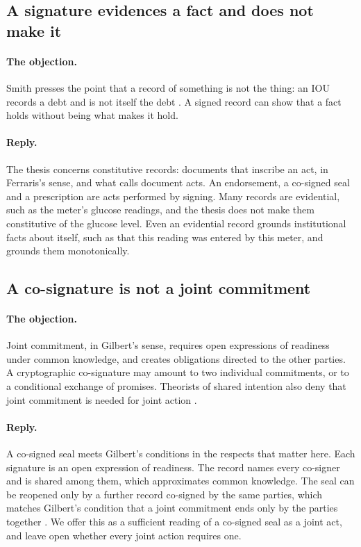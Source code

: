 \subsection{A signature evidences a fact and does not make it}\label{sec:obj-evidence}

\paragraph{The objection.} Smith presses the point that a record of something is not the thing: an
IOU records a debt and is not itself the debt \citep[p.~289]{smithsearle2003}. A signed record can show that a fact
holds without being what makes it hold.

\paragraph{Reply.} The thesis concerns constitutive records: documents that inscribe an act, in
Ferraris's sense, and what \citet{smith2012} calls document acts. An endorsement, a co-signed seal and
a prescription are acts performed by signing. Many records are evidential, such as the meter's
glucose readings, and the thesis does not make them constitutive of the glucose level. Even an
evidential record grounds institutional facts about itself, such as that this reading was entered by
this meter, and grounds them monotonically.

\subsection{A co-signature is not a joint commitment}\label{sec:obj-joint}

\paragraph{The objection.} Joint commitment, in Gilbert's sense, requires open expressions of
readiness under common knowledge, and creates obligations directed to the other parties. A
cryptographic co-signature may amount to two individual commitments, or to a conditional exchange of
promises. Theorists of shared intention also deny that joint commitment is needed for joint action
\citep{kopec2018}.

\paragraph{Reply.} A co-signed seal meets Gilbert's conditions in the respects that matter here. Each
signature is an open expression of readiness. The record names every co-signer and is shared among
them, which approximates common knowledge. The seal can be reopened only by a further record
co-signed by the same parties, which matches Gilbert's condition that a joint commitment ends only by
the parties together \citep{gilbert2013}. We offer this as a sufficient reading of a co-signed seal as
a joint act, and leave open whether every joint action requires one.

